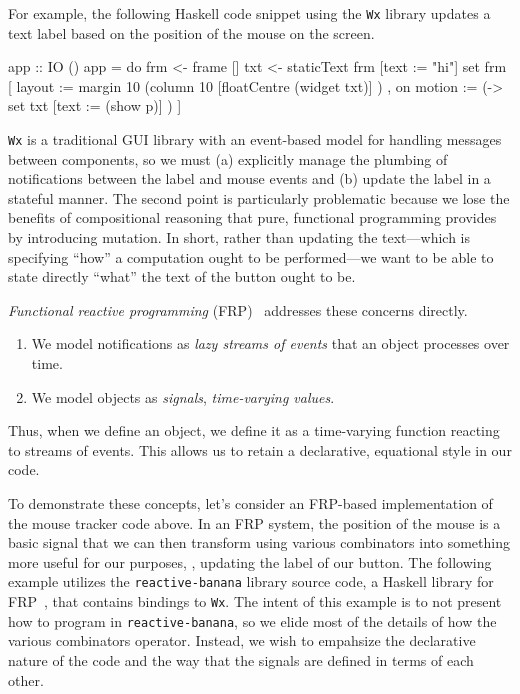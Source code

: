 For example, the following Haskell code snippet using the \texttt{Wx} library updates a text label  based on the position of the mouse on the screen.
\begin{haskellcode}
app :: IO ()
app = do
  frm <- frame []
  txt <- staticText frm [text := "hi"]
  set frm
    [ layout := margin 10 (column 10 [floatCentre (widget txt)] )
    , on motion := (\p -> set txt [text := (show p)] ) ]
\end{haskellcode}
\texttt{Wx} is a traditional GUI library with an event-based model for handling messages between components, so we must (a) explicitly manage the plumbing of notifications between the label and mouse events and (b) update the label in a stateful manner.
The second point is particularly problematic because we lose the benefits of compositional reasoning that pure, functional programming provides by introducing mutation.
In short, rather than updating the text---which is specifying ``how'' a computation ought to be performed---we want to be able to state directly ``what'' the text of the button ought to be.

\emph{Functional reactive programming} (FRP)~\cite{elliott1997, czaplicki2013, finkbeiner2019, jeffrey2012} addresses these concerns directly.
\begin{enumerate}[itemsep=0pt]
  \item We model notifications as \emph{lazy streams of events} that an object processes over time.
  \item We model objects as \emph{signals}, \emph{time-varying values}.
\end{enumerate}
Thus, when we define an object, we define it as a time-varying function reacting to streams of events.
This allows us to retain a declarative, equational style in our code.

To demonstrate these concepts, let's consider an FRP-based implementation of the mouse tracker code above.
In an FRP system, the position of the mouse is a basic signal that we can then transform using various combinators into something more useful for our purposes, \eg, updating the label of our button.
The following example utilizes the \texttt{reactive-banana} library source code, a Haskell library for FRP~\cite{reactive-banana}, that contains bindings to \texttt{Wx}.
The intent of this example is to not present how to program in \texttt{reactive-banana}, so we elide most of the details of how the various combinators operator.
Instead, we wish to empahsize the declarative nature of the code and the way that the signals are defined in terms of each other.

